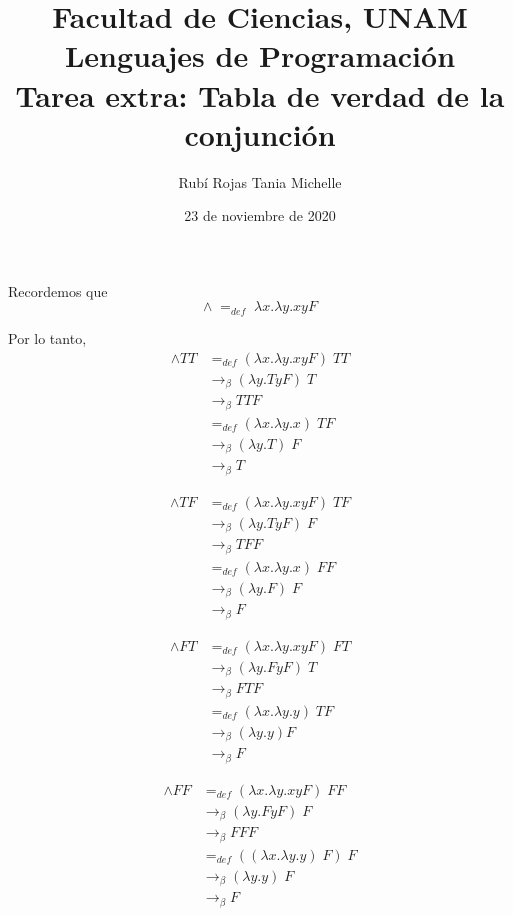 \documentclass[letterpaper,11pt]{article}
\title{Facultad de Ciencias, UNAM \\ 
       Lenguajes de Programación \\ 
       Tarea extra: Tabla de verdad de la conjunción}
\author{Rubí Rojas Tania Michelle }
\date{23 de noviembre de 2020}
\begin{document}
\maketitle

Recordemos que 
\begin{equation*}
    \land \; =_{def} \; \lambda x. \lambda y.xyF 
\end{equation*}

Por lo tanto,  
\begin{align*}
    \land TT
    &=_{def} (\lambda x. \lambda y.xyF) \; TT \\
    &\rightarrow_{\beta} (\lambda y.TyF) \; T \\
    &\rightarrow_{\beta} TTF \\
    &=_{def} (\lambda x. \lambda y.x) \; TF \\
    &\rightarrow_{\beta} (\lambda y.T) \; F \\
    &\rightarrow_{\beta} T
\end{align*}

\begin{align*}
    \land TF 
    &=_{def} (\lambda x. \lambda y.xyF) \; TF \\
    &\rightarrow_{\beta} (\lambda y.TyF) \; F \\
    &\rightarrow_{\beta} TFF \\
    &=_{def} (\lambda x. \lambda y.x) \; FF \\
    &\rightarrow_{\beta} (\lambda y.F) \; F \\
    &\rightarrow_{\beta} F
\end{align*}

\begin{align*}
    \land FT 
    &=_{def} (\lambda x. \lambda y.xyF) \; FT \\
    &\rightarrow_{\beta} (\lambda y.FyF) \; T \\
    &\rightarrow_{\beta} FTF \\
    &=_{def} (\lambda x. \lambda y.y) \; TF \\
    &\rightarrow_{\beta} (\lambda y.y) F \\ 
    &\rightarrow_{\beta} F
\end{align*}

\begin{align*}
    \land FF 
    &=_{def} (\lambda x. \lambda y.xyF) \; FF \\
    &\rightarrow_{\beta} (\lambda y.FyF) \; F \\
    &\rightarrow_{\beta} FFF \\ 
    &=_{def} ((\lambda x. \lambda y.y) \; F) \; F \\
    &\rightarrow_{\beta} (\lambda y.y) \; F \\
    &\rightarrow_{\beta} F
\end{align*}
\end{document}
